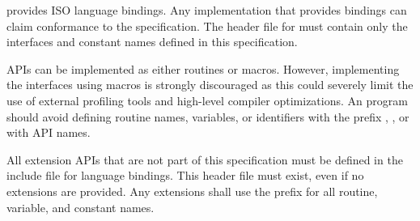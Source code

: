 \openshmem provides ISO \Cstd language bindings. Any implementation that
provides \Cstd bindings can claim conformance to the specification. The
\openshmem header file  for \Cstd must contain only the
interfaces and constant names defined in this specification.

\openshmem \acp{API} can be implemented as either routines or macros. However,
implementing the interfaces using macros is strongly discouraged as this could
severely limit the use of external profiling tools and high-level compiler
optimizations. An \openshmem program should avoid defining routine names,
variables, or identifiers with the prefix \shmemprefix, \shmemprefixC, or with
\openshmem \ac{API} names.

All \openshmem extension \acp{API} that are not part of this specification must
be defined in the  include file for language bindings. This
header file must exist, even if no extensions are provided. Any extensions
shall use the  prefix for all routine, variable, and constant
names.
